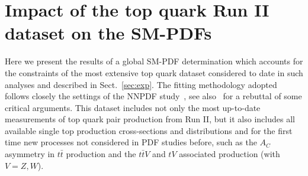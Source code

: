 \documentclass[withindex,glossary]{cam-thesis}
\begin{document}
%




\section{Impact of the top quark Run II dataset on the SM-PDFs}
\label{sec:baseline_sm_fits}

Here we present the results of a global SM-PDF determination which accounts for the constraints
of the most extensive top quark dataset considered to date
in such analyses and described in Sect.~\ref{sec:exp}.
%
The fitting methodology adopted follows closely the settings of the NNPDF
study~\cite{NNPDF:2021njg}, see also~\cite{Ball:2022uon} for a rebuttal of some critical arguments.
%
This dataset includes not only the most up-to-date measurements of top quark
pair production from Run II, but it also includes all available single top
production cross-sections and distributions 
and for the first time new processes not considered in PDF studies before,
such as the $A_C$ asymmetry in $t\bar{t}$ production and the $t\bar{t}V$ and
$tV$ associated production (with $V = Z,W$).
\end{document}
